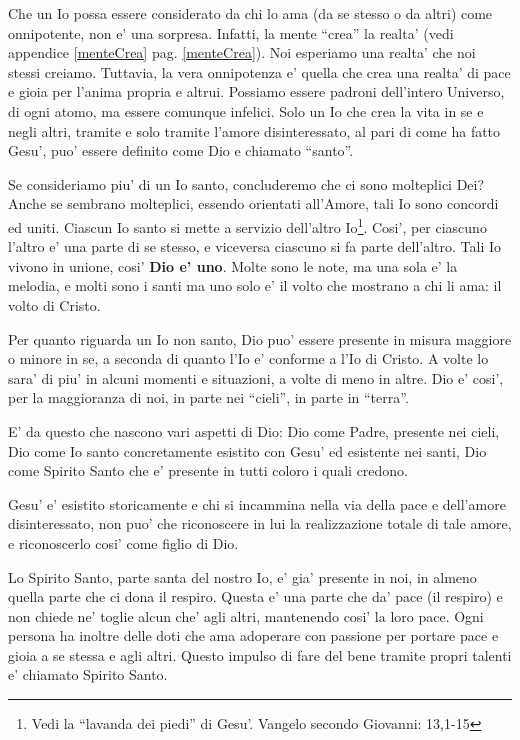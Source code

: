 Che un Io possa essere considerato da chi lo ama (da se stesso o da altri) come onnipotente, non e' una sorpresa. Infatti, la mente ``crea'' la realta' (vedi appendice \ref{menteCrea} pag. \ref{menteCrea}). Noi esperiamo una realta' che noi stessi creiamo. Tuttavia, la vera onnipotenza e' quella che crea una realta' di pace e gioia per l'anima propria e altrui. Possiamo essere padroni dell'intero Universo, di ogni atomo, ma essere comunque infelici. Solo un Io che crea la vita in se e negli altri, tramite e solo tramite l'amore disinteressato, al pari di come ha fatto Gesu', puo' essere definito come Dio e chiamato ``santo''.

Se consideriamo piu' di un Io santo, concluderemo che ci sono molteplici Dei? Anche se sembrano molteplici, essendo orientati all'Amore, tali Io sono concordi ed uniti. Ciascun Io santo si mette a servizio dell'altro Io\footnote{Vedi la ``lavanda dei piedi'' di Gesu'. Vangelo secondo Giovanni: 13,1-15}. Cosi', per ciascuno l'altro e' una parte di se stesso, e viceversa ciascuno si fa parte dell'altro. Tali Io vivono in unione, cosi' \textbf{Dio e' uno}. Molte sono le note, ma una sola e' la melodia, e molti sono i santi ma uno solo e' il volto che mostrano a chi li ama: il volto di Cristo. 

Per quanto riguarda un Io non santo, Dio puo' essere presente in misura maggiore o minore in se, a seconda di quanto l'Io e' conforme a l'Io di Cristo. A volte lo sara' di piu' in alcuni momenti e situazioni, a volte di meno in altre.
Dio e' cosi', per la maggioranza di noi, in parte nei ``cieli'', in parte in ``terra''. 

E' da questo che nascono vari aspetti di Dio: Dio come Padre, presente nei cieli, Dio come Io santo concretamente esistito con Gesu' ed esistente nei santi, Dio come Spirito Santo che e' presente in tutti coloro i quali credono.

Gesu' e' esistito storicamente e chi si incammina nella via della pace e dell'amore disinteressato, non puo' che riconoscere in lui la realizzazione totale di tale amore, e riconoscerlo cosi' come figlio di Dio.

Lo Spirito Santo, parte santa del nostro Io, e' gia' presente in noi, in almeno quella parte che ci dona il respiro. Questa e' una parte che da' pace (il respiro) e non chiede ne' toglie alcun che' agli altri, mantenendo cosi' la loro pace. Ogni persona ha inoltre delle doti che ama adoperare con passione per portare pace e gioia a se stessa e agli altri. Questo impulso di fare del bene tramite propri talenti e' chiamato Spirito Santo.

